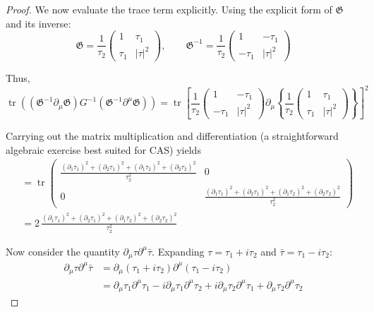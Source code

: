 \begin{tcolorbox}[breakable]
\begin{proof}
		We now evaluate the trace term explicitly. Using the explicit form of \(\mathfrak{G}\) and its inverse:
		\begin{equation}
			\mathfrak{G} = \frac{1}{\tau_2} \begin{pmatrix} 1 & \tau_1 \\ \tau_1 & |\tau|^2 \end{pmatrix}, \qquad
			\mathfrak{G}^{-1} = \frac{1}{\tau_2} \begin{pmatrix} 1 & -\tau_1 \\ -\tau_1 & |\tau|^2 \end{pmatrix}
		\end{equation}
		
		Thus,
		\begin{equation}
			\operatorname{tr}\left((\mathfrak{G}^{-1}\partial_\mu \mathfrak{G})G^{-1}(\mathfrak{G}^{-1}\partial^\mu \mathfrak{G})\right)
			= \operatorname{tr}\left[ \frac{1}{\tau_2} \begin{pmatrix} 1 & -\tau_1 \\ -\tau_1 & |\tau|^2 \end{pmatrix}
			\partial_\mu \left\{ \frac{1}{\tau_2} \begin{pmatrix} 1 & \tau_1 \\ \tau_1 & |\tau|^2 \end{pmatrix} \right\} \right]^2
		\end{equation}
		
		Carrying out the matrix multiplication and differentiation (a straightforward algebraic exercise best suited for CAS) yields
		\begin{align}
			&= \operatorname{tr}
			\begin{pmatrix}
				\frac{(\partial_1 \tau_1)^2 + (\partial_2 \tau_1)^2 + (\partial_1 \tau_2)^2 + (\partial_2 \tau_2)^2}{\tau_2^2} & 0 \\
				0 & \frac{(\partial_1 \tau_1)^2 + (\partial_2 \tau_1)^2 + (\partial_1 \tau_2)^2 + (\partial_2 \tau_2)^2}{\tau_2^2}
			\end{pmatrix} \\
			&= 2\,\frac{(\partial_1 \tau_1)^2 + (\partial_2 \tau_1)^2 + (\partial_1 \tau_2)^2 + (\partial_2 \tau_2)^2}{\tau_2^2}
		\end{align}
		
		Now consider the quantity \(\partial_\mu \tau \partial^\mu \bar{\tau}\). Expanding \(\tau = \tau_1 + i\tau_2\) and \(\bar{\tau} = \tau_1 - i\tau_2\):
		\begin{align}
			\partial_\mu \tau \partial^\mu \bar{\tau} 
			&= \partial_\mu (\tau_1 + i\tau_2) \partial^\mu (\tau_1 - i\tau_2) \\
			&= \partial_\mu \tau_1 \partial^\mu \tau_1 - i\partial_\mu \tau_1 \partial^\mu \tau_2 
			+ i\partial_\mu \tau_2 \partial^\mu \tau_1 + \partial_\mu \tau_2 \partial^\mu \tau_2
		\end{align}
		

\end{proof}
\end{tcolorbox}
